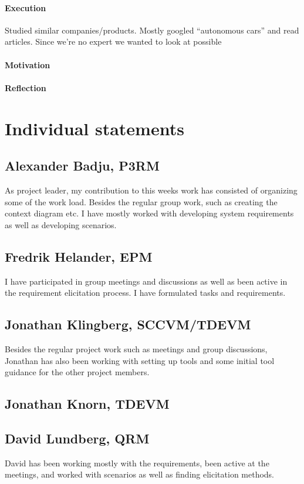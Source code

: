 \documentclass[10pt]{article}
\begin{document}
\paragraph{Execution}
Studied similar companies/products. Mostly googled “autonomous cars” and read articles. 
Since we’re no expert we wanted to look at possible
\paragraph{Motivation}
\paragraph{Reflection}

\section{Individual statements}
\noindent
\subsection{Alexander Badju, P3RM}
As project leader, my contribution to this weeks work has consisted of organizing some of the work load. Besides the regular group work, such as creating the context diagram etc. I have mostly worked with developing system requirements as well as developing scenarios. 
\subsection{Fredrik Helander, EPM}
I have participated in group meetings and discussions as well as been active in the requirement elicitation process. I have formulated tasks and requirements.  
\subsection{Jonathan Klingberg, SCCVM/TDEVM}
Besides the regular project work such as meetings and group discussions, Jonathan has also been working with setting up tools and some initial tool guidance for the other project members.
\subsection{Jonathan Knorn, TDEVM}
\subsection{David Lundberg, QRM}
David has been working mostly with the requirements, been active at the meetings, and worked with scenarios as well as finding elicitation methods.
\end{document}
